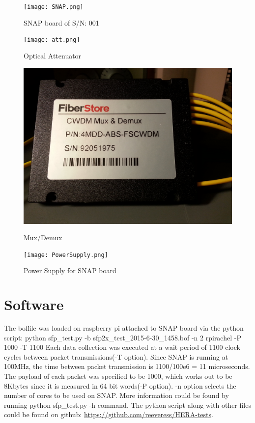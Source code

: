 \documentclass{article}
\begin{document}
\begin{figure}[h]
\centering
	\begin{minipage}{.4\textwidth}
		\centering
		\texttt{[image: SNAP.png]}
		\caption{SNAP board of S/N: 001} 
	\end{minipage}
	\begin{minipage}{.4\textwidth}
		\centering
		\texttt{[image: att.png]}
		\caption{Optical Attenuator}
	\end{minipage}
\end{figure}

\begin{figure}[h]
\centering
	\begin{minipage}{.4\textwidth}
		\centering
		\includegraphics[width = .8\linewidth]{mux.jpg}
		\caption{Mux/Demux}
	\end{minipage}
	\begin{minipage}{.4\textwidth}
		\centering
		\texttt{[image: PowerSupply.png]}
		\caption{Power Supply for SNAP board}
	\end{minipage}
\end{figure}

\section*{Software}
The boffile was loaded on raspberry pi attached to SNAP board via the python script:
\newline
python sfp\_test.py -b sfp2x\_test\_2015-6-30\_1458.bof -n 2 rpirachel -P 1000 -T 1100
\newline
Each data collection was executed at a wait period of 1100 clock cycles between packet transmissions(-T option). Since SNAP is running at 100MHz, the time between packet transmission is 1100/100e6 = 11 microseconds. The payload of each packet was specified to be 1000, which works out to be 8Kbytes since it is measured in 64 bit words(-P option). -n option selects the number of cores to be used on SNAP. More information could be found by running python sfp\_test.py -h command. The python script along with other files could be found on github: \url{https://github.com/reeveress/HERA-tests}.
\end{document}
